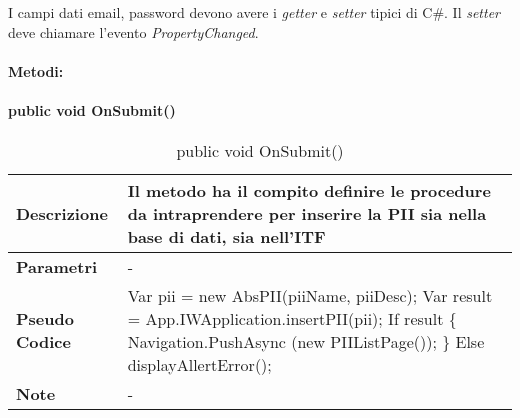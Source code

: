 I campi dati email, password devono avere i \emph{getter} e \emph{setter} tipici di C\#. Il \emph{setter} deve chiamare l’evento \emph{PropertyChanged}.
\paragraph{Metodi:}

\paragraph{public void OnSubmit()}
\begin{center}
    \begin{longtable}{|p{3cm}|p{9cm}|}%
    \caption{public void OnSubmit()}
    \endfirsthead
    \endhead
    \hline
    \textbf{Descrizione} & Il metodo ha il compito definire le procedure da intraprendere per inserire la PII sia nella base di dati, sia nell’ITF\\
    \hline
    \textbf{Parametri} &      
    -
    \\
    \hline
    \textbf{Pseudo Codice} & 
    Var pii = new AbsPII(piiName, piiDesc);\newline
    Var result = App.IWApplication.insertPII(pii);\newline
    If result \{\newline
        Navigation.PushAsync (new PIIListPage());\newline
    \}\newline
    Else displayAllertError();\newline
    \\
    \hline
    \textbf{Note} & 
    -
    \\
    \hline
    \end{longtable}
\end{center}